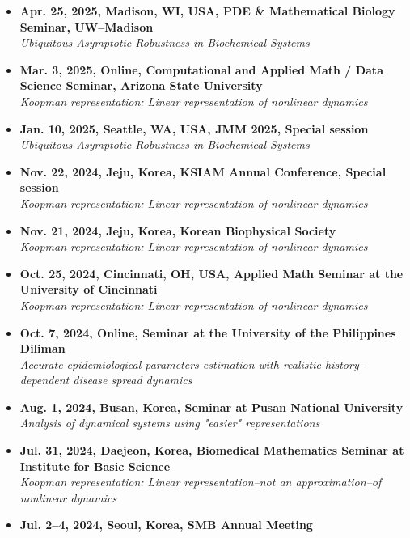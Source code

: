 \documentclass[margin,line]{res}
\begin{document}
\begin{resume}
\begin{itemize}[leftmargin=0pt, label={}]
    \textit{Network Translation of a Stochastic Reaction Network to Reveal Stationary Distributions}
    \item \textbf{Apr. 25, 2025, Madison, WI, USA, PDE \& Mathematical Biology Seminar, UW–Madison} \\
    \textit{Ubiquitous Asymptotic Robustness in Biochemical Systems}
    \item \textbf{Mar. 3, 2025, Online, Computational and Applied Math / Data Science Seminar, Arizona State University} \\
    \textit{Koopman representation: Linear representation of nonlinear dynamics}
    \item \textbf{Jan. 10, 2025, Seattle, WA, USA, JMM 2025, Special session} \\
    \textit{Ubiquitous Asymptotic Robustness in Biochemical Systems}
    \item \textbf{Nov. 22, 2024, Jeju, Korea, KSIAM Annual Conference, Special session} \\
    \textit{Koopman representation: Linear representation of nonlinear dynamics}
    \item \textbf{Nov. 21, 2024, Jeju, Korea, Korean Biophysical Society} \\
    \textit{Koopman representation: Linear representation of nonlinear dynamics}
    \item \textbf{Oct. 25, 2024, Cincinnati, OH, USA, Applied Math Seminar at the University of Cincinnati} \\
    \textit{Koopman representation: Linear representation of nonlinear dynamics}
    \item \textbf{Oct. 7, 2024, Online, Seminar at the University of the Philippines Diliman} \\
    \textit{Accurate epidemiological parameters estimation with realistic history-dependent disease spread dynamics}
    \item \textbf{Aug. 1, 2024, Busan, Korea, Seminar at Pusan National University} \\
    \textit{Analysis of dynamical systems using "easier" representations}
    \item \textbf{Jul. 31, 2024, Daejeon, Korea, Biomedical Mathematics Seminar at Institute for Basic Science} \\
    \textit{Koopman representation: Linear representation--not an approximation--of nonlinear dynamics}
    \item \textbf{Jul. 2–4, 2024, Seoul, Korea, SMB Annual Meeting} \\

\end{itemize}
\end{resume}
\end{document}
